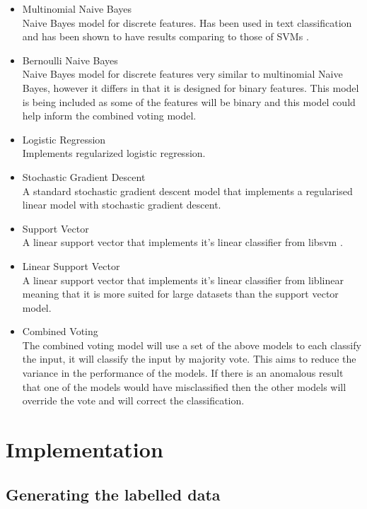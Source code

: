 \documentclass[11pt,oneside]{book}
\begin{document}
\begin{itemize}
\item Multinomial Naive Bayes \\
Naive Bayes model for discrete features. Has been used in text classification and has been shown to have results comparing to those of SVMs \citep{MNB}.
\item Bernoulli Naive Bayes \\
Naive Bayes model for discrete features very similar to multinomial Naive Bayes, however it differs in that it is designed for binary features. This model is being included as some of the features will be binary and this model could help inform the combined voting model. 
\item Logistic Regression \\
Implements regularized logistic regression.
\item Stochastic Gradient Descent \\
A standard stochastic gradient descent model that implements a regularised linear model with stochastic gradient descent.
\item Support Vector \\
A linear support vector that implements it's linear classifier from libsvm \citep{libsvm}.
\item Linear Support Vector \\
A linear support vector that implements it's linear classifier from liblinear \citep{liblinear} meaning that it is more suited for large datasets than the support vector model.
\item Combined Voting \\
The combined voting model will use a set of the above models to each classify the input, it will classify the input by majority vote. This aims to reduce the variance in the performance of the models. If there is an anomalous result that one of the models would have misclassified then the other models will override the vote and will correct the classification.
\end{itemize}

\section{Implementation}

\subsection{Generating the labelled data}
\end{document}
